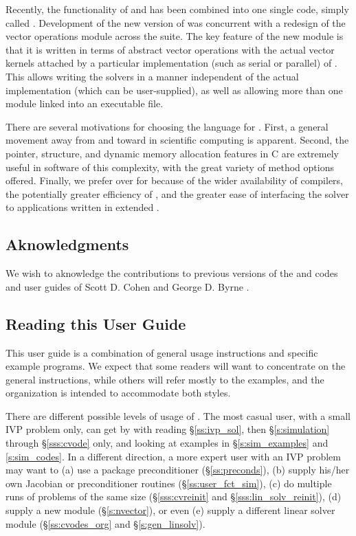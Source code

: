 Recently, the functionality of {\cvode} and {\pvode} has been combined into
one single code, simply called {\cvode}.
Development of the new version of {\cvode} was concurrent with a redesign of the vector operations module
across the {\sundials} suite. The key feature of the new {\nvector} module is that it
is written in terms of abstract vector operations with the actual vector kernels attached
by a particular implementation (such as serial or parallel) of {\nvector}. This allows
writing the {\sundials} solvers in a manner independent of the actual {\nvector} 
implementation (which can be user-supplied), as well as allowing more than one 
{\nvector} module linked into an executable file.

There are several motivations for choosing the {\C} language for {\cvode}.
First, a general movement away from {\F} and toward {\C} in scientific
computing is apparent.  Second, the pointer, structure, and dynamic
memory allocation features in C are extremely useful in software of
this complexity, with the great variety of method options offered.
Finally, we prefer {\C} over {\CPP} for {\cvode} because of the wider
availability of {\C} compilers, the potentially greater efficiency of {\C},
and the greater ease of interfacing the solver to applications written
in extended {\F}.

\subsection{Aknowledgments}
We wish to aknowledge the contributions to previous versions of the
{\cvode} and {\pvode} codes and user guides of Scott D. Cohen \cite{CH94}
and George D. Byrne \cite{ByH98}.

\subsection{Reading this User Guide}\label{ss:reading}

This user guide is a combination of general usage instructions and
specific example programs.  We expect that some readers will want to
concentrate on the general instructions, while others will refer
mostly to the examples, and the organization is intended to
accommodate both styles.

There are different possible levels of usage of {\cvode}. The most casual
user, with a small IVP problem only, can get by with reading \S\ref{ss:ivp_sol}, 
then \S\ref{s:simulation} through \S\ref{sss:cvode} only, and looking at examples 
in \S\ref{s:sim_examples} and \A\ref{s:sim_codes}. 
In a different direction, a more expert user with an IVP problem may want
to (a) use a package preconditioner (\S\ref{ss:preconds}), (b) supply
his/her own Jacobian or preconditioner routines (\S\ref{ss:user_fct_sim}),
(c) do multiple runs of problems of the same size (\S\ref{sss:cvreinit} and
\S\ref{sss:lin_solv_reinit}), (d) supply a new {\nvector} module
(\S\ref{s:nvector}), or even (e) supply a different linear solver module
(\S\ref{ss:cvodes_org} and \S\ref{s:gen_linsolv}).

